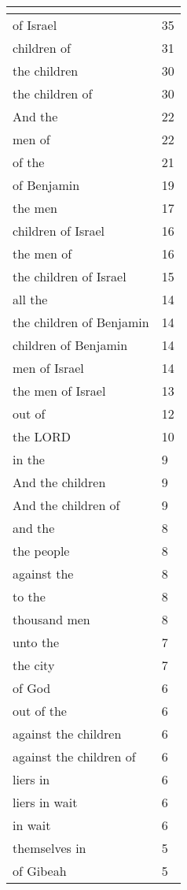 \begin{center}
\begin{longtable}{|p{3.0in}|p{0.5in}|}
\hline \multicolumn{2}{c}{{ }} \\ \hline
\endfoot 
of Israel & 35\\ \hline 
children of & 31\\ \hline 
the children & 30\\ \hline 
the children of & 30\\ \hline 
And the & 22\\ \hline 
men of & 22\\ \hline 
of the & 21\\ \hline 
of Benjamin & 19\\ \hline 
the men & 17\\ \hline 
children of Israel & 16\\ \hline 
the men of & 16\\ \hline 
the children of Israel & 15\\ \hline 
all the & 14\\ \hline 
the children of Benjamin & 14\\ \hline 
children of Benjamin & 14\\ \hline 
men of Israel & 14\\ \hline 
the men of Israel & 13\\ \hline 
out of & 12\\ \hline 
the LORD & 10\\ \hline 
in the & 9\\ \hline 
And the children & 9\\ \hline 
And the children of & 9\\ \hline 
and the & 8\\ \hline 
the people & 8\\ \hline 
against the & 8\\ \hline 
to the & 8\\ \hline 
thousand men & 8\\ \hline 
unto the & 7\\ \hline 
the city & 7\\ \hline 
of God & 6\\ \hline 
out of the & 6\\ \hline 
against the children & 6\\ \hline 
against the children of & 6\\ \hline 
liers in & 6\\ \hline 
liers in wait & 6\\ \hline 
in wait & 6\\ \hline 
themselves in & 5\\ \hline 
of Gibeah & 5\\ \hline 

\end{longtable}
\end{center}
